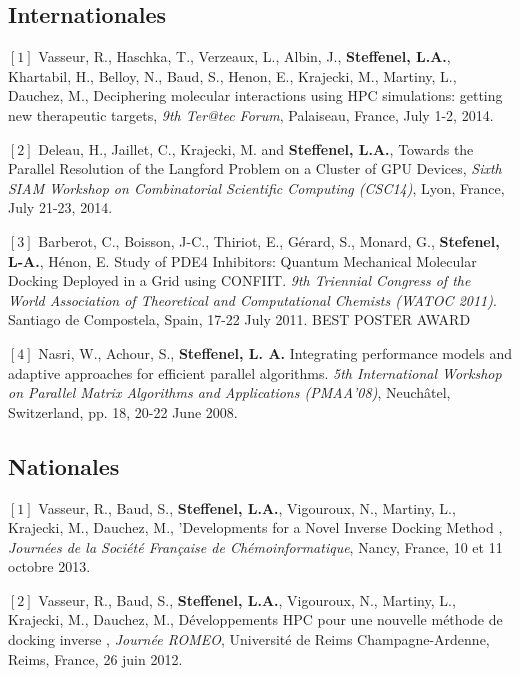 \documentclass[final,twoside]{hdr} %
\begin{document}
\subsection*{Internationales}

\noindent $[1]$
Vasseur, R., Haschka, T., Verzeaux, L., Albin, J., \textbf{Steffenel, L.A.}, Khartabil, H., Belloy, N., Baud, S., Henon, E., Krajecki, M., Martiny, L., Dauchez, M., {Deciphering molecular interactions using HPC simulations: getting new therapeutic targets}, {\em 9th Ter@tec Forum}, Palaiseau, France, July 1-2, 2014.

\vspace{1em} \noindent $[2]$
Deleau, H., Jaillet, C., Krajecki, M. and \textbf{Steffenel, L.A.}, {Towards the Parallel Resolution of the Langford Problem on a Cluster of GPU Devices}, {\em Sixth SIAM Workshop on Combinatorial Scientific Computing (CSC14)}, Lyon, France, July 21-23, 2014.

\vspace{1em} \noindent $[3]$
Barberot, C., Boisson, J-C., Thiriot, E., Gérard, S., Monard, G., \textbf{Stefenel, L-A.}, Hénon, E. {Study of PDE4 Inhibitors: Quantum Mechanical Molecular Docking Deployed in a Grid using CONFIIT}. {\em 9th Triennial Congress of the World Association of Theoretical and Computational Chemists (WATOC 2011)}. Santiago de Compostela, Spain, 17-22 July 2011. BEST POSTER AWARD

\vspace{1em} \noindent $[4]$
Nasri, W., Achour, S., \textbf{Steffenel, L. A.} {Integrating performance models and adaptive approaches for efficient parallel algorithms}. {\em 5th International Workshop on Parallel Matrix Algorithms and Applications (PMAA'08)}, Neuchâtel, Switzerland, pp. 18, 20-22 June 2008. 

\subsection*{Nationales}

 \noindent $[1]$
Vasseur, R., Baud, S., \textbf{Steffenel, L.A.}, Vigouroux, N., Martiny, L., Krajecki, M., Dauchez, M., {'Developments for a Novel Inverse Docking Method} , {\em Journées de la Société Française de Chémoinformatique}, Nancy, France, 10 et 11 octobre 2013.

\vspace{1em} \noindent $[2]$
Vasseur, R., Baud, S.,\textbf{ Steffenel, L.A.}, Vigouroux, N., Martiny, L., Krajecki, M., Dauchez, M., {Développements HPC pour une nouvelle méthode de docking inverse} , {\em Journée ROMEO}, Université de Reims Champagne-Ardenne, Reims, France, 26 juin 2012.
\end{document}
